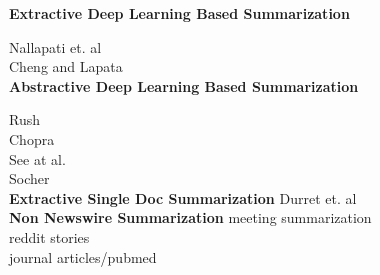 
\textbf{Extractive Deep Learning Based Summarization}

Nallapati et. al\\
Cheng and Lapata\\

\textbf{Abstractive Deep Learning Based Summarization}

Rush\\
Chopra\\
See at al.\\ 
Socher\\

\textbf{Extractive Single Doc Summarization}
Durret et. al\\

\textbf{Non Newswire Summarization}
meeting summarization\\
reddit stories \\
journal articles/pubmed \\



